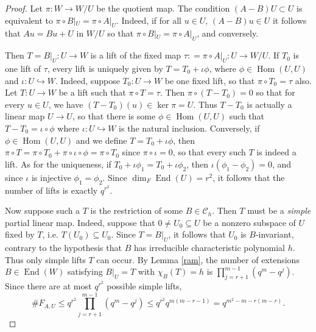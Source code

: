 \documentclass[preprint,11pt]{amsart}
\newcommand{\CalC}{\mathcal{C}}
\theoremstyle{definition}
\numberwithin{thm}{section}
\newcommand{\Hom}{\operatorname{Hom}}
\newcommand{\End}{\operatorname{End}}
\begin{document}
\begin{proof}

Let $\pi: W \to W/U$ be the quotient map. The condition $(A-B)U \subset U$ is equivalent to $\pi \circ B|_U = \pi \circ A|_U$. Indeed, if for all $u \in U$, $(A-B)u \in U$ it follows that $Au = Bu + U$ in $W/U$ so that $\pi \circ B|_U = \pi \circ A|_U$, and conversely. 

Then $T = B|_U : U \to W$ is a lift of the fixed map $\tau : = \pi \circ A|_U : U \to W/U$. If $T_0$ is one lift of $\tau$, every lift is uniquely given by $T = T_0 + \iota \phi$, where $\phi \in \Hom(U,U)$ and $\iota : U \hookrightarrow W$. Indeed, suppose $T_0 : U \to W$ be one fixed lift, so that $\pi \circ T_0 = \tau$ also. Let $T: U \to W$ be a lift such that $\pi \circ T = \tau$. Then $\pi \circ (T - T_0) = 0$ so that for every $u \in U$, we have $(T - T_0)(u) \in \ker \pi = U$. Thus $T-T_0$ is actually a linear map $U \to U$, so that there is some $\phi \in \Hom(U,U)$ such that $T - T_0 = \iota \circ \phi$ where $\iota : U \hookrightarrow W$ is the natural inclusion. Conversely, if $\phi \in \Hom(U,U)$ and we define $T = T_0 + \iota  \phi$, then $\pi \circ T = \pi \circ T_0 + \pi \circ \iota \circ \phi = \pi \circ T_0$ since $\pi \circ \iota = 0$, so that every such $T$ is indeed a lift. As for the uniqueness, if $T_0 + \iota \phi_1 = T_0 + \iota \phi_2$, then $\iota (\phi_1  - \phi_2) = 0$, and since $\iota$ is injective $\phi_1 = \phi_2$. Since $\dim_{F} \End(U) = r^2$, it follows that the number of lifts is exactly $q^{r^2}.$


Now suppose such a $T$ is the restriction of some $B \in \CalC_h$. Then $T$ must be a \textit{simple} partial linear map. Indeed, suppose that $0 \neq U_0 \subseteq U$ be a nonzero subspace of $U$ fixed by $T$, i.e. $T(U_0) \subseteq U_0$. Since $T = B|_U$, it follows that $U_0$ is $B$-invariant, contrary to the hypothesis that $B$ has irreducible characteristic polynomial $h$. Thus only simple lifts $T$ can occur.  By Lemma \ref{ram}, the number of extensions $B \in \End(W)$ satisfying $B|_U = T$ with $\chi_B(T) = h$ is $\prod_{j =r +1}^{m-1} (q^m -q^j)$. Since there are at most $q^{r^2}$	possible simple lifts, 
$$
\#F_{A, U} \leq q^{r^2} \prod_{j=r+1}^{m-1}(q^m -q^j) \leq q^{r^2} q^{m(m-r-1)} = q^{m^2-m - r(m-r)}.
$$
\end{proof}
\end{document}
